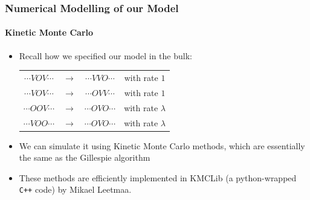 \documentclass{beamer}
\begin{document}
\begin{frame}
 \frametitle{Numerical Modelling of our Model}
 \framesubtitle{Kinetic Monte Carlo}
 \begin{itemize}
  \item Recall how we specified our model in the bulk:
  \\
  \begin{center}
    \begin{tabular}{c c c c}
  $\cdots VOV\cdots$ & $\longrightarrow$ & $\cdots VVO \cdots$ & with rate $1$ \\
  $\cdots VOV\cdots$ & $\longrightarrow$ & $\cdots OVV \cdots$ & with rate $1$ \\
  $\cdots OOV\cdots$ & $\longrightarrow$ & $\cdots OVO \cdots$ & with rate $\lambda$ \\
  $\cdots VOO\cdots$ & $\longrightarrow$ & $\cdots OVO \cdots$ & with rate $\lambda$ \\
 \end{tabular}
  \end{center}
  \item We can simulate it using Kinetic Monte Carlo methods, which are essentially the same as the Gillespie algorithm
  \item These methods are efficiently implemented in KMCLib (a python-wrapped \texttt{C++} code) by Mikael Leetmaa.
 \end{itemize}

\end{frame}
\end{document}
